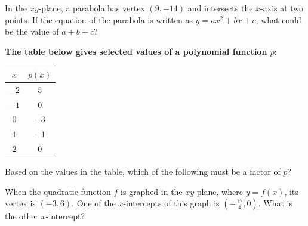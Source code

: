 \vspace{2em}

\noindent\markforreview
\vspace{1em}

In the $xy$-plane, a parabola has vertex $(9, -14)$ and intersects the $x$-axis at two points.  
If the equation of the parabola is written as $y = ax^2 + bx + c$, what could be the value of $a + b + c$?

\vspace{0.75em}



\newpage
\noindent\markforreview
\vspace{1em}

\textbf{The table below gives selected values of a polynomial function $p$:}

\begin{center}
\begin{tabular}{|c|c|}
\hline
$x$ & $p(x)$ \\
\hline
$-2$ & $5$ \\
$-1$ & $0$ \\
$0$ & $-3$ \\
$1$ & $-1$ \\
$2$ & $0$ \\
\hline
\end{tabular}
\end{center}

Based on the values in the table, which of the following must be a factor of $p$?

\vspace{0.75em}


\vspace{1.3em}

\noindent\markforreview
\vspace{1em}

When the quadratic function $f$ is graphed in the $xy$-plane, where $y = f(x)$, its vertex is $(-3, 6)$.  
One of the $x$-intercepts of this graph is $\left(-\frac{17}{4}, 0\right)$.  
What is the other $x$-intercept?

\vspace{0.75em}


